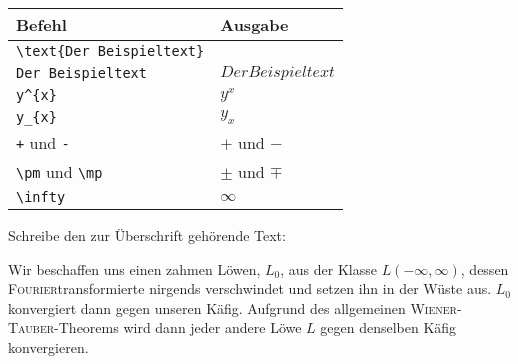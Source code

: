 \begin{frame}[fragile]
	\begin{center}
		\begin{tabular}{ll}
			\toprule
			Befehl									&	Ausgabe					\\ \midrule
			\lstinline|\text{Der Beispieltext}|		&	\text{Der Beispieltext}	\\
			\lstinline|Der Beispieltext|			&	$Der Beispieltext$		\\
			\lstinline|y^{x}|						&	$y^{x}$					\\
			\lstinline|y_{x}|						&	$y_{x}$					\\
			\lstinline|+|	und 	\lstinline|-|	&	$+$	und $-$				\\
			\lstinline|\pm| und \lstinline|\mp|		&	$\pm$ und $\mp$			\\
			\lstinline|\infty|						&	$\infty$			    \\
			\bottomrule
		\end{tabular}
	\end{center}
	\pause\btVFill
	\Aufgabee
		Schreibe den zur Überschrift  gehörende Text:
	\begin{outputbox}
		Wir beschaffen uns einen zahmen Löwen, $L_0$, aus der Klasse $L(- \infty, \infty)$, dessen \textsc{Fourier}transformierte nirgends verschwindet und setzen ihn in der Wüste aus. $L_0$ konvergiert dann gegen unseren Käfig. Aufgrund des allgemeinen \textsc{Wiener}-\textsc{Tauber}-Theorems wird dann jeder andere Löwe $L$ gegen denselben Käfig konvergieren.
	\end{outputbox}
	\vspace{0.3cm}
\end{frame}
